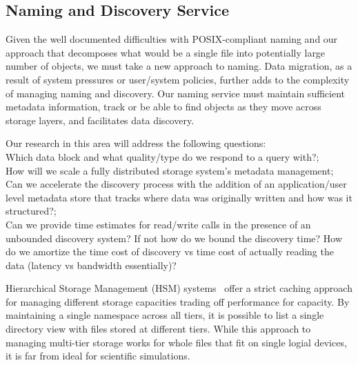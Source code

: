 \subsection{Naming and Discovery Service}

Given the well documented difficulties with POSIX-compliant naming and our
approach that decomposes what would be a single file into potentially large
number of objects, we must take a new approach to naming.  Data migration, as a
result of system pressures or user/system policies, further adds to the
complexity of managing naming and discovery. Our naming service must maintain
sufficient metadata information, track or be able to find objects as they move
across storage layers, and facilitates data discovery.

Our research in this area will address the following questions:\\
   Which data block and what quality/type do we respond to a query
    with?;\\
   How will we scale a fully distributed storage system's metadata
    management;\\
   Can we accelerate the discovery process with the addition of an
    application/user level metadata store that tracks where data was
    originally written and how was it structured?;\\
   Can we provide time estimates for read/write calls in the presence of
    an unbounded discovery system? If not how do we bound the discovery time?
   How do we amortize the time cost of discovery vs time cost of actually reading the data
    (latency vs bandwidth essentially)?

Hierarchical Storage Management (HSM) systems~\cite{hsm} offer a strict caching approach
for managing different storage capacities trading off performance for capacity.
By maintaining a single namespace across all tiers, it is possible to list a
single directory view with files stored at different tiers. While this approach
to managing multi-tier storage works for whole files that fit on single logial
devices, it is far from ideal for scientific simulations.

